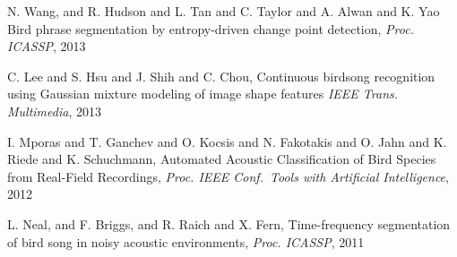 \documentclass{article}
\begin{document}
\begin{thebibliography}{100}
N. Wang, and R. Hudson and L. Tan and C. Taylor and A. Alwan and K. Yao
Bird phrase segmentation by entropy-driven change point detection,
\emph{Proc. ICASSP}, 2013

C. Lee and S. Hsu and J. Shih and C. Chou, 
Continuous birdsong recognition using Gaussian mixture modeling of image shape features
\emph{IEEE Trans. Multimedia}, 2013

I. Mporas and T. Ganchev and O. Kocsis and N. Fakotakis and
O. Jahn and K. Riede and K. Schuchmann, 
Automated Acoustic Classification of Bird Species from Real-Field Recordings,
\emph{Proc. IEEE Conf.~Tools with Artificial Intelligence}, 2012

L. Neal, and F. Briggs, and R. Raich and X. Fern,
Time-frequency segmentation of bird song in noisy acoustic environments,
\emph{Proc. ICASSP}, 2011



















\end{thebibliography}
    
\end{document}
